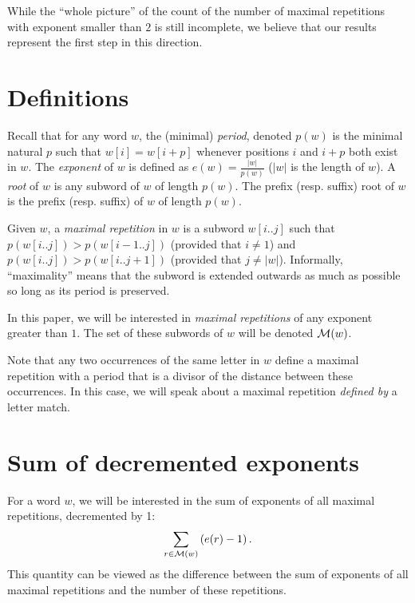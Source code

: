 \documentclass[11pt]{article}
\def\paren#1{\left( #1 \right)}
\newcommand{\mr}[1]{{\cal M}({#1})}
\newcommand{\p}[1]{p({#1})}
\begin{document}
While the ``whole picture'' of the count of the number of maximal
repetitions with exponent smaller than $2$ is still incomplete, we
believe that our results represent the first step in this direction. 

\section{Definitions}
Recall that for any word $w$, the (minimal) {\em period}, denoted $\p{w}$ is
the minimal natural $p$ such that $w[i]=w[i+p]$ whenever positions $i$
and $i+p$ both exist in $w$.
The {\em exponent} of $w$ is defined as $e(w)=\frac{|w|}{\p{w}}$ ($|w|$ is
the length of $w$). 
A {\em root} of $w$ is any subword of $w$ of length $\p{w}$. The
prefix (resp. suffix) root of $w$ is the prefix (resp. suffix) of $w$
of length $\p{w}$.

Given $w$, a {\em maximal repetition} in $w$ is a subword $w[i..j]$
such that $\p{w[i..j]}>\p{w[i-1..j]}$ (provided that $i\neq 1$) and
$\p{w[i..j]}>\p{w[i..j+1]}$ (provided that $j\neq |w|$). Informally,
``maximality'' means that the subword is extended outwards as much
as possible so long as its period is preserved. 

In this paper, we will be interested in {\em maximal repetitions} of
any exponent greater than $1$. The set of these subwords of $w$ will
be denoted $\mr{w}$. 

Note that any two occurrences of the same letter in $w$ define a
maximal repetition with a period that is a divisor of the distance
between these occurrences. In this case, we will speak about a maximal repetition
{\em defined by} a letter match. 




\section{Sum of decremented exponents}
\label{sum}

For a word $w$, we will be interested in the sum of exponents of all
maximal repetitions, decremented by 1:
\begin{equation}
\sum_{r\in \mr{w}}\paren{e(r)-1}.
\label{main-sum}
\end{equation}
This quantity can be viewed as the difference between the sum of
exponents of all maximal repetitions and the number of these
repetitions. 
\end{document}
